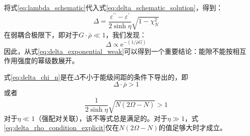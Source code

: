将式\ref{eq:lambda_schematic}代入式\ref{eq:delta_schematic_solution}，得到：
\begin{equation}
\Delta=\frac{\varepsilon^{\prime\prime}-\varepsilon^{\prime}}{2\sinh\eta}\sqrt{1-\chi^{2}_{N}}\label{eq:delta_chi_n}
\end{equation}
在弱耦合极限下，即对于$G\cdot\bar{\rho}\ll1$，我们发现：
\begin{equation}
\Delta\propto\mathrm{e}^{-(1/\bar{\rho}G)}\label{eq:delta_exponential_weak}
\end{equation}
因此，从式\ref{eq:delta_exponential_weak}可以得到一个重要结论：能隙不能按相互作用强度的幂级数展开。

式\ref{eq:delta_chi_n}是在$\Delta$不小于能级间距的条件下导出的，即
\begin{equation}
\Delta\cdot\bar{\rho}>1\label{eq:delta_rho_condition}
\end{equation}
或者
\begin{equation}
\frac{1}{2\sinh\eta}\sqrt{N(2\Omega-N)}>1\label{eq:delta_rho_condition_explicit}
\end{equation}
对于$\eta\ll1$（强配对关联），该不等式总是满足的。对于$\eta\gg1$，式\ref{eq:delta_rho_condition_explicit}仅在$N(2\Omega-N)$的值足够大时才成立。

